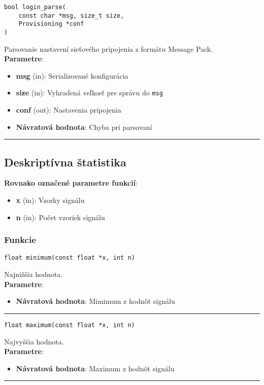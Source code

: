 \begin{lstlisting}[style=docs]
bool login_parse(
	const char *msg, size_t size, 
	Provisioning *conf
)
\end{lstlisting}
Parsovanie nastavení sieťového pripojenia z formátu Message Pack. \\ 
\textbf{Parametre}:
\begin{itemize}[noitemsep, topsep=0pt]
	\item \textbf{msg} (in): Serializované konfigurácia
 	\item \textbf{size} (in): Vyhradená veľkosť pre správu do \verb|msg|
	\item \textbf{conf} (out): Nastavenia pripojenia
	\item \textbf{Návratová hodnota}: Chyba pri parsovaní
\end{itemize}
\bigbreak
\hrule


\subsection{Deskriptívna štatistika} \label{modules:statistics}

\textbf{Rovnako označené parametre funkcií}:
\begin{itemize}[noitemsep, topsep=0pt]
	\item \textbf{x} (in): Vzorky signálu
	\item \textbf{n} (in):  Počet vzoriek signálu
\end{itemize}

\subsubsection*{Funkcie}
\begin{lstlisting}[style=docs]
float minimum(const float *x, int n)
\end{lstlisting}
Najnižšia hodnota. \\ 
\textbf{Parametre}:
\begin{itemize}[noitemsep, topsep=0pt]
	\item \textbf{Návratová hodnota}: Mimimum z hodnôt signálu
\end{itemize}
\bigbreak
\hrule

\begin{lstlisting}[style=docs]
float maximum(const float *x, int n)
\end{lstlisting}
Najvyššia hodnota. \\ 
\textbf{Parametre}:
\begin{itemize}[noitemsep, topsep=0pt]
	\item \textbf{Návratová hodnota}: Maximum z hodnôt signálu
\end{itemize}
\bigbreak
\hrule

